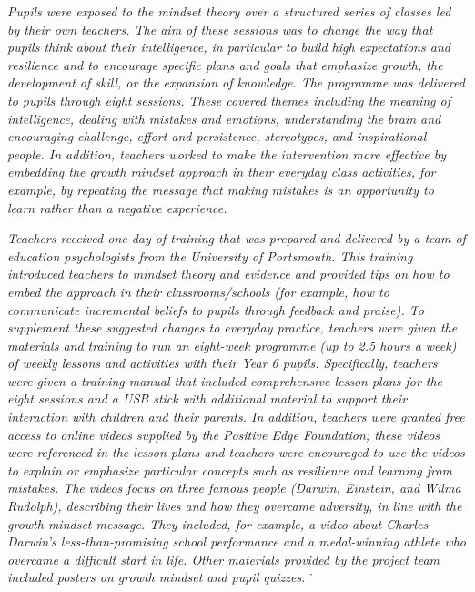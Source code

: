 \documentclass{krantz}
\begin{document}
\emph{Pupils were exposed to the mindset theory over a structured series of classes led by their own teachers. The aim of these sessions was to change the way that pupils think about their intelligence, in particular to build high expectations and resilience and to encourage specific plans and goals that emphasize growth, the development of skill, or the expansion of knowledge. The programme was delivered to pupils through eight sessions. These covered themes including the meaning of intelligence, dealing with mistakes and emotions, understanding the brain and encouraging challenge, effort and persistence, stereotypes, and inspirational people. In addition, teachers worked to make the intervention more effective by embedding the growth mindset approach in their everyday class activities, for example, by repeating the message that making mistakes is an opportunity to learn rather than a negative experience.}

\emph{Teachers received one day of training that was prepared and delivered by a team of education psychologists from the University of Portsmouth. This training introduced teachers to mindset theory and evidence and provided tips on how to embed the approach in their classrooms/schools (for example, how to communicate incremental beliefs to pupils through feedback and praise). To supplement these suggested changes to everyday practice, teachers were given the materials and training to run an eight-week programme (up to 2.5 hours a week) of weekly lessons and activities with their Year 6 pupils. Specifically, teachers were given a training manual that included comprehensive lesson plans for the eight sessions and a USB stick with additional material to support their interaction with children and their parents. In addition, teachers were granted free access to online videos supplied by the Positive Edge Foundation; these videos were referenced in the lesson plans and teachers were encouraged to use the videos to explain or emphasize particular concepts such as resilience and learning from mistakes. The videos focus on three famous people (Darwin, Einstein, and Wilma Rudolph), describing their lives and how they overcame adversity, in line with the growth mindset message. They included, for example, a video about Charles Darwin's less-than-promising school performance and a medal-winning athlete who overcame a difficult start in life. Other materials provided by the project team included posters on growth mindset and pupil quizzes.} ˙
\end{document}
